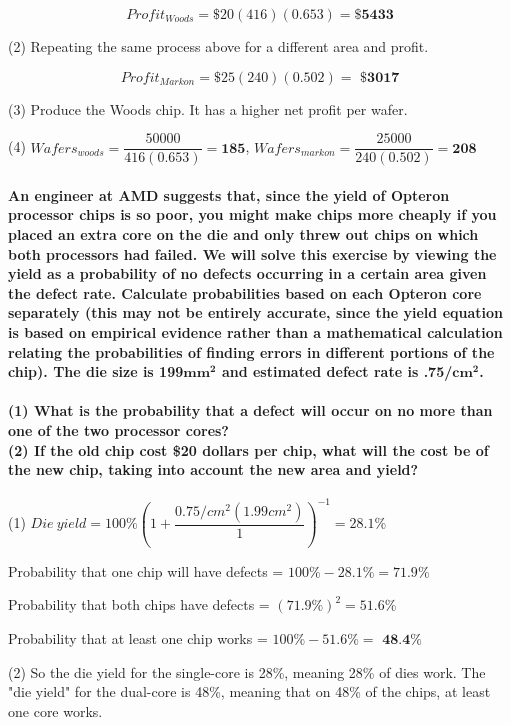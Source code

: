 \documentclass{article}
\begin{document}
$$
Profit_{Woods} = \$20(416)(0.653) = \textbf{\$5433}
$$

\noindent (2) Repeating the same process above for a different area and profit.

$$
Profit_{Markon} = \$25(240)(0.502) =\textbf{ \$3017}
$$

\noindent (3) Produce the Woods chip. It has a higher net profit per wafer.

\noindent (4) $Wafers_{woods} = \dfrac{50000}{416(0.653)} = \textbf{185}$, $Wafers_{markon} = \dfrac{25000}{240(0.502)} = \textbf{208}$

\paragraph{An engineer at AMD suggests that, since the yield of Opteron processor chips is so poor,
you might make chips more cheaply if you placed an extra core on the die and only
threw out chips on which both processors had failed. We will solve this exercise by
viewing the yield as a probability of no defects occurring in a certain area given the
defect rate. Calculate probabilities based on each Opteron core separately (this may not
be entirely accurate, since the yield equation is based on empirical evidence rather than a
mathematical calculation relating the probabilities of finding errors in different portions
of the chip). The die size is 199$\mathbf{mm^2}$ and estimated defect rate is .75/$\mathbf{cm^2}$.\\
\\ (1) What is the probability that a defect will occur on no more than one of the two
processor cores?
\\ (2) If the old chip cost \$20 dollars per chip, what will the cost be of the new chip, taking
into account the new area and yield?}

(1) $
Die\ yield = 100\% \left(1 + \dfrac{0.75/cm^2(1.99cm^2)}{1}\right)^{-1} = 28.1\%
$

Probability that one chip will have defects = $100\% - 28.1\% = 71.9\%$

Probability that both chips have defects = $(71.9\%)^2 =  51.6\%$

Probability that at least one chip works = $100\% - 51.6\% =\textbf{ 48.4\%}$

\noindent (2) So the die yield for the single-core is 28\%, meaning 28\% of dies work.  The "die yield" for the dual-core is 48\%, meaning that on 48\% of the chips, at least one core works. 
\end{document}

